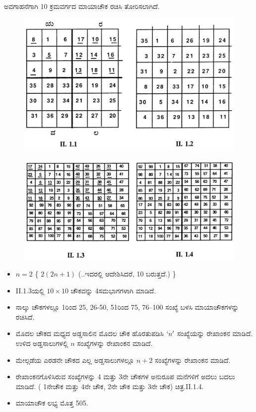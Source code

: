 ಅವಗಾಹನೆಗಾಗಿ 10 ಕ್ರಮವರ್ಗದ ಮಾಯಾಚೌಕ ರಚಿಸಿ ತೋರಿಸಲಾಗಿದೆ.
\begin{figure}[h]
\includegraphics{src/figures/chap3/fig3.14.jpg}
\end{figure}
\begin{figure}[h]
\includegraphics{src/figures/chap3/fig3.15.jpg}
\end{figure}

\begin{itemize}
	\item $n=2$ \{ $2(2n+1)$ (..ಇದರಲ್ಲಿ ಆದೇಶಿಸಿದರೆ, 10 ಬರುತ್ತದೆ.) \}
	\item II.1.3ಯಲ್ಲಿ $10\times 10$ ಚೌಕವನ್ನು 4ಸಮಭಾಗಗಳಾಗಿ ಮಾಡಿದೆ.
	\item ನಾಲ್ಕು ಚೌಕಗಳಲ್ಲೂ 1ರಿಂದ 25, 26-50, 51ರಿಂದ 75, 76--100 ಸಂಖ್ಯೆ ಬಳಸಿ ಮಾಯಾಚೌಕಗಳನ್ನು ರಚಿಸಿದೆ.
	\item ಮೊದಲ ಚೌಕದ ಮಧ್ಯದ ಅಡ್ಡಸಾಲಿನ ಮೊದಲ ಚೌಕ ಹೊರತುಪಡಿಸಿ $`n'$ ಸಂಖ್ಯೆಯನ್ನು ರೇಖಾಂಕನ ಮಾಡಿದೆ. ಉಳಿದ ಅಡ್ಡಸಾಲುಗಳಲ್ಲಿ $n$ ಸಂಖ್ಯೆಗಳನ್ನು ರೇಖಾಂಕನ ಮಾಡಿದೆ.
	\item ಮೇಲ್ಗಡೆಯ ಎರಡನೇ ಚೌಕದ ಎಲ್ಲ ಅಡ್ಡಸಾಲುಗಳಲ್ಲೂ $n+2$ ಸಂಖ್ಯೆಗಳನ್ನು ರೇಖಾಂಕನ ಮಾಡಿದೆ.
	\item ರೇಖಾಂಕನಗೊಳಿಸಿರುವ ಸಂಖ್ಯೆಗಳನ್ನು 4 ಮತ್ತು 3ನೇ ಚೌಕಗಳ ಅನುರೂಪ ಮನೆಗಳಿಗೆ ಅದಲು ಬದಲು ಮಾಡಿದೆ. ( 1ನೇಚೌಕ ಮತ್ತು 4ನೇ ಚೌಕ, 2ನೇ ಚೌಕ ಮತ್ತು 3ನೇ ಚೌಕ) ಚಿತ್ರ.II.1.4.
	\item ಮಾಯಾಚೌಕ ಲಭ್ಯ ಮೊತ್ತ 505.
\end{itemize}

